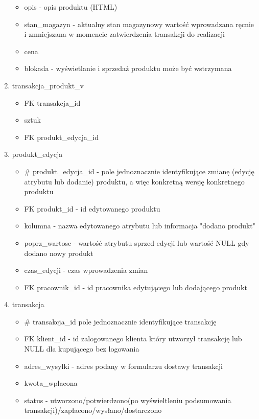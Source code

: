 \begin{enumerate}
\begin{itemize}
	\item opis - opis produktu (HTML)
	\item stan\_magazyn - aktualny stan magazynowy wartość wprowadzana ręcnie i zmniejszana w momencie zatwierdzenia transakcji do realizacji
	\item cena
	\item blokada - wyświetlanie i sprzedaż produktu może być wstrzymana
	\end{itemize} 
\item transakcja\_produkt\_v
\begin{itemize}
	\item FK transakcja\_id
	\item sztuk
	\item FK produkt\_edycja\_id
\end{itemize}
\item produkt\_edycja
\begin{itemize}
	\item \# produkt\_edycja\_id - pole jednoznacznie identyfikujące zmianę (edycję atrybutu lub dodanie) produktu, a więc konkretną wersję konkretnego produktu
	\item FK produkt\_id - id edytowanego produktu
	\item kolumna - nazwa edytowanego atrybutu lub informacja "dodano produkt"
	\item poprz\_wartosc - wartość atrybutu sprzed edycji lub  wartość NULL gdy dodano nowy produkt
	\item czas\_edycji - czas wprowadzenia zmian
	\item FK pracownik\_id - id pracownika edytującego lub dodającego produkt
\end{itemize}
\item transakcja
\begin{itemize}
	\item \# transakcja\_id pole jednoznacznie identyfikujące transakcję
	\item FK klient\_id - id zalogowanego klienta który utworzył transakcję lub NULL dla kupującego bez logowania
	\item adres\_wysylki - adres podany w formularzu dostawy transakcji
	\item kwota\_wplacona
	\item status - utworzono/potwierdzono(po wyświeltleniu podsumowania transakcji)/zapłacono/wysłano/dostarczono
\end{itemize}

\end{enumerate}


